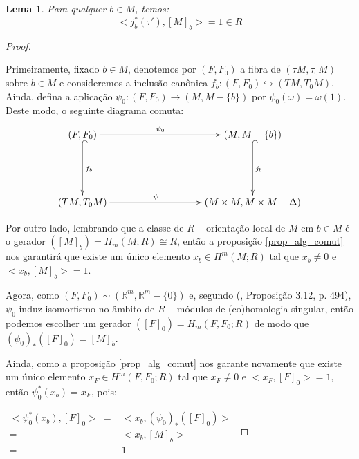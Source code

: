 \documentclass[12pt,oneside]{book} %
\newtheorem{lem}    {\hspace{0.5cm}Lema}[chapter]
\newcommand{\R}{\mathbb{R}}
\begin{document}
\begin{lem}\label{lema_tec_wu}
	Para qualquer $b\in M$, temos:
	$$ <j_{b}^{*}(\tau'),[M]_{b}>=1\in R $$
\end{lem}

\begin{proof}
	
	\
	
	\par Primeiramente, fixado $b\in M$, denotemos por $(F,F_{0})$ a fibra de $(\tau M,\tau_{0}M)$ sobre $b\in M$ e consideremos a inclusão canônica $f_{b}:(F,F_{0})\hookrightarrow (TM,T_{0}M)$. Ainda, defina a aplicação $\psi_{0}:(F,F_{0})\to (M,M-\{b\})$ por $\psi_{0}(\omega)=\omega(1)$. Deste modo, o seguinte diagrama comuta:
	$$ \xymatrix @C=0.5cm {
		(F,F_{0}) \ar[rrrrr]^-{\psi_{0}} \ar@{^(->}[dd]^-{f_{b}} &&&&& (M,M-\{b\}) \ar@{^(->}[dd]^-{j_{b}} \\
		&&&&& \\		 		
		(TM,T_{0}M) \ar[rrrrr]^-{\psi} &&&&& (M\times M,M\times M-\Delta)
	} $$
	
	\par Por outro lado, lembrando que a classe de $R-$orientação local de $M$ em $b\in M$ é o gerador $([M]_{b})=H_{m}(M;R)\cong R$, então a proposição \ref{prop_alg_comut} nos garantirá que existe um único elemento $x_{b}\in H^{m}(M;R)$ tal que $x_{b}\neq 0$ e $<x_{b},[M]_{b}>=1$.
	
	\par Agora, como $(F,F_{0})\sim (\R^{m},\R^{m}-\{0\})$ e, segundo (\cite{fadell_1}, Proposição 3.12, p. 494), $\psi_{0}$ induz isomorfismo no âmbito de $R-$módulos de (co)homologia singular, então podemos escolher um gerador $([F]_{0})=H_{m}(F,F_{0};R)$ de modo que $(\psi_{0})_{*}([F]_{0})=[M]_{b}$.
	
	\par Ainda, como a proposição \ref{prop_alg_comut} nos garante novamente que existe um único elemento $x_{F}\in H^{m}(F,F_{0};R)$ tal que $x_{F}\neq 0$ e $<x_{F},[F]_{0}>=1$, então $\psi_{0}^{*}(x_{b})=x_{F}$, pois:\newline
	
	$ \begin{array}{rl}
		<\psi_{0}^{*}(x_{b}),[F]_{0}> \ = & <x_{b},(\psi_{0})_{*}([F]_{0})> \\
		= & <x_{b},[M]_{b}> \\
		= & 1
	\end{array} $ \newline
	

\end{proof}
\end{document}
